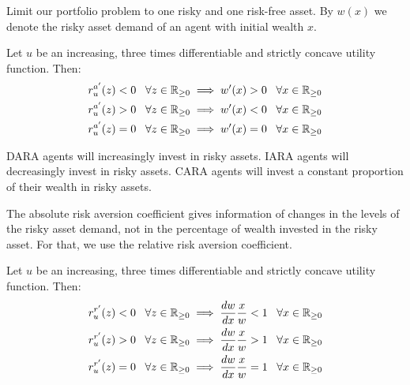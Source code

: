 \documentclass[twoside]{article}
\begin{document}
Limit our portfolio problem to one risky and one risk-free asset. By $w(x)$ we denote the risky asset demand of an agent with initial wealth $x$.

\begin{proposition}
    Let $u$ be an increasing, three times differentiable and strictly concave utility function. Then:
    \begin{align*}
        r^{a'}_u(z) < 0 \;\;\; \forall z \in \mathbb{R}_{\geq 0} & \implies w'(x) > 0 \;\;\; \forall x \in \mathbb{R}_{\geq 0} \\
        r^{a'}_u(z) > 0 \;\;\; \forall z \in \mathbb{R}_{\geq 0} & \implies w'(x) < 0 \;\;\; \forall x \in \mathbb{R}_{\geq 0} \\
        r^{a'}_u(z) = 0 \;\;\; \forall z \in \mathbb{R}_{\geq 0} & \implies w'(x) = 0 \;\;\; \forall x \in \mathbb{R}_{\geq 0}
    \end{align*}
    \begin{explanation}
        DARA agents will increasingly invest in risky assets. IARA agents will decreasingly invest in risky assets. CARA agents will invest a constant proportion of their wealth in risky assets.
    \end{explanation}
\end{proposition}

The absolute risk aversion coefficient gives information of changes in the levels of the risky asset demand, not in the percentage of wealth invested in the risky asset. For that, we use the relative risk aversion coefficient.

\begin{proposition}
    Let $u$ be an increasing, three times differentiable and strictly concave utility function. Then:
    \begin{align*}
        r^{r'}_u(z) < 0 \;\;\; \forall z \in \mathbb{R}_{\geq 0} & \implies \frac{dw}{dx}\frac{x}{w} < 1 \;\;\; \forall x \in \mathbb{R}_{\geq 0} \\
        r^{r'}_u(z) > 0 \;\;\; \forall z \in \mathbb{R}_{\geq 0} & \implies \frac{dw}{dx}\frac{x}{w} > 1 \;\;\; \forall x \in \mathbb{R}_{\geq 0} \\
        r^{r'}_u(z) = 0 \;\;\; \forall z \in \mathbb{R}_{\geq 0} & \implies \frac{dw}{dx}\frac{x}{w} = 1 \;\;\; \forall x \in \mathbb{R}_{\geq 0}
    \end{align*}
    \begin{explanation}
    \end{explanation}
\end{proposition}
\end{document}
